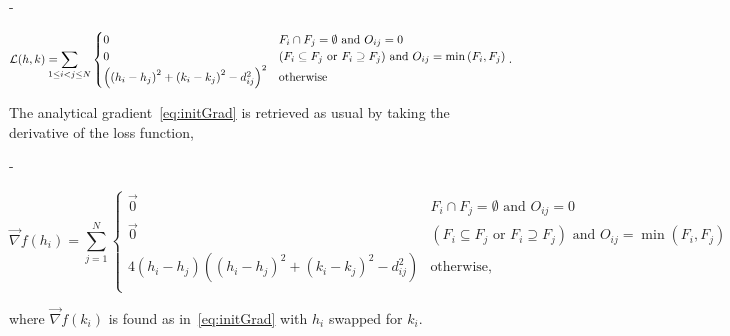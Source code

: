 \documentclass[
  oneside,
  openany,
  numbers=noendperiod,
  parskip=half,
  bibliography=totoc
]{scrbook}\usepackage[]{graphicx}\usepackage{xcolor}
\newlength{\overhang}
\newenvironment{fullwidth}{%
  \blockmargin
  \begin{addmargin*}[0em]{-\overhang}%
}{%
  \end{addmargin*}%
  \unblockmargin
}
\begin{document}
\begin{fullwidth}
\begin{equation}
  \mathcal{L}(h,k) = \displaystyle\smashoperator[l]{\sum_{1\leq i<j\leq N}}
  \begin{cases}
    0 & F_i \cap F_j = \emptyset \text{ and } O_{ij} = 0\\
    0 & (F_i \subseteq F_j \text{ or } F_i \supseteq F_j) \text{ and } O_{ij}=\min{(F_i,F_j)}\\
   \left(\left(h_i-h_j\right)^2+\left(k_i-k_j\right)^2-d_{ij}^2\right)^2  & \text{otherwise} \\
  \end{cases}. \label{eq:initLoss}
\end{equation}
\end{fullwidth}
The analytical gradient~\eqref{eq:initGrad} is retrieved as usual by
taking the derivative of the loss function,
\begin{fullwidth}
\begin{equation}
  \vec{\nabla} f(h_i) = \sum_{j=1}^N
  \begin{cases}
    \vec{0} & F_i \cap F_j = \emptyset \text{ and } O_{ij} = 0\\
    \vec{0} & (F_i \subseteq F_j \text{ or } F_i \supseteq F_j) \text{ and } O_{ij}=\min{(F_i,F_j)}\\
    4\left(h_i-h_j\right)\left(\left(h_i-h_j\right)^2+\left(k_i-k_j\right)^2-d_{ij}^2\right) & \text{otherwise}, \\
  \end{cases} \label{eq:initGrad}
\end{equation}
\end{fullwidth}
where $\vec{\nabla} f(k_i)$ is found as in~\eqref{eq:initGrad} with $h_i$
swapped for $k_i$.
\end{document}
